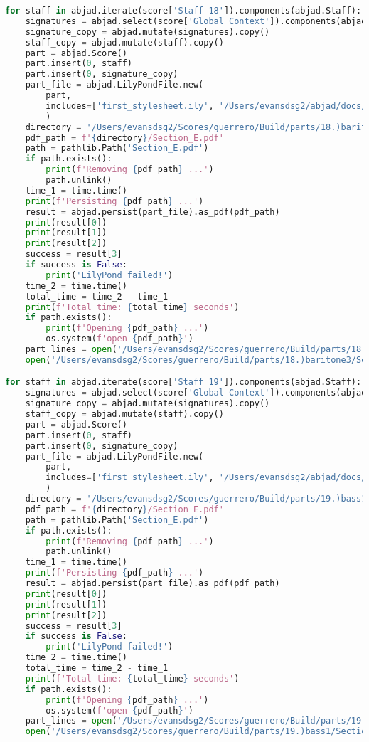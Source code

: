 \begin{lstlisting}[language=Python, caption=Invocation Source Code]
for staff in abjad.iterate(score['Staff 18']).components(abjad.Staff):
    signatures = abjad.select(score['Global Context']).components(abjad.Staff)
    signature_copy = abjad.mutate(signatures).copy()
    staff_copy = abjad.mutate(staff).copy()
    part = abjad.Score()
    part.insert(0, staff)
    part.insert(0, signature_copy)
    part_file = abjad.LilyPondFile.new(
        part,
        includes=['first_stylesheet.ily', '/Users/evansdsg2/abjad/docs/source/_stylesheets/abjad.ily'],
        )
    directory = '/Users/evansdsg2/Scores/guerrero/Build/parts/18.)baritone3'
    pdf_path = f'{directory}/Section_E.pdf'
    path = pathlib.Path('Section_E.pdf')
    if path.exists():
        print(f'Removing {pdf_path} ...')
        path.unlink()
    time_1 = time.time()
    print(f'Persisting {pdf_path} ...')
    result = abjad.persist(part_file).as_pdf(pdf_path)
    print(result[0])
    print(result[1])
    print(result[2])
    success = result[3]
    if success is False:
        print('LilyPond failed!')
    time_2 = time.time()
    total_time = time_2 - time_1
    print(f'Total time: {total_time} seconds')
    if path.exists():
        print(f'Opening {pdf_path} ...')
        os.system(f'open {pdf_path}')
    part_lines = open('/Users/evansdsg2/Scores/guerrero/Build/parts/18.)baritone3/Section_E.ly').readlines()
    open('/Users/evansdsg2/Scores/guerrero/Build/parts/18.)baritone3/Section_E.ly', 'w').writelines(part_lines[15:-1])

for staff in abjad.iterate(score['Staff 19']).components(abjad.Staff):
    signatures = abjad.select(score['Global Context']).components(abjad.Staff)
    signature_copy = abjad.mutate(signatures).copy()
    staff_copy = abjad.mutate(staff).copy()
    part = abjad.Score()
    part.insert(0, staff)
    part.insert(0, signature_copy)
    part_file = abjad.LilyPondFile.new(
        part,
        includes=['first_stylesheet.ily', '/Users/evansdsg2/abjad/docs/source/_stylesheets/abjad.ily'],
        )
    directory = '/Users/evansdsg2/Scores/guerrero/Build/parts/19.)bass1'
    pdf_path = f'{directory}/Section_E.pdf'
    path = pathlib.Path('Section_E.pdf')
    if path.exists():
        print(f'Removing {pdf_path} ...')
        path.unlink()
    time_1 = time.time()
    print(f'Persisting {pdf_path} ...')
    result = abjad.persist(part_file).as_pdf(pdf_path)
    print(result[0])
    print(result[1])
    print(result[2])
    success = result[3]
    if success is False:
        print('LilyPond failed!')
    time_2 = time.time()
    total_time = time_2 - time_1
    print(f'Total time: {total_time} seconds')
    if path.exists():
        print(f'Opening {pdf_path} ...')
        os.system(f'open {pdf_path}')
    part_lines = open('/Users/evansdsg2/Scores/guerrero/Build/parts/19.)bass1/Section_E.ly').readlines()
    open('/Users/evansdsg2/Scores/guerrero/Build/parts/19.)bass1/Section_E.ly', 'w').writelines(part_lines[15:-1])


\end{lstlisting}
